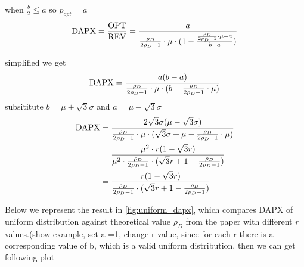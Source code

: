 when  $\frac{b}{2} \leqslant a$ so $p_{opt} = a$ 
\begin{equation}\notag
\text{DAPX} = \frac{\text{OPT}}{\text{REV}} =  \frac{a}{\frac{\rho_{D}}{2\rho_{D}-1}\cdot \mu \cdot (1-\frac{\frac{\rho_{D}}{2\rho_{D}-1}\cdot \mu -a}{b-a})}
\end{equation} 

simplified we get 
\begin{equation}\notag
\text{DAPX}=\frac{a(b-a)}{\frac{\rho_{D}}{2\rho_{D}-1}\cdot \mu \cdot(b-\frac{\rho_{D}}{2\rho_{D}-1}\cdot \mu)}
\end{equation} 
subsititute $b =  \mu +\sqrt{3}\sigma $ and $a  = \mu - \sqrt{3}\sigma$
\begin{equation}\notag
\begin{split}	
	\text{DAPX} &=\frac{2\sqrt{3}\sigma (\mu - \sqrt{3}\sigma)}{\frac{\rho_{D}}{2\rho_{D}-1}\cdot \mu \cdot( \sqrt{3}\sigma + \mu-\frac{\rho_{D}}{2\rho_{D}-1}\cdot \mu)} \\&= \frac{\mu^2 \cdot r( 1-\sqrt{3}r )}{\mu^2 \cdot \frac{\rho_{D}}{2\rho_{D}-1}\cdot( \sqrt{3}r+ 1-\frac{\rho_{D}}{2\rho_{D}-1})}\\ &= \frac{r( 1-\sqrt{3}r )}{\frac{\rho_{D}}{2\rho_{D}-1}\cdot( \sqrt{3}r+ 1-\frac{\rho_{D}}{2\rho_{D}-1})}
\end{split}
\end{equation} 

Below we represent the result in \cref{fig:uniform_dapx}, which compares DAPX of uniform distribution against theoretical value $\rho_D$ from the paper with different $r$ values.(show example, set a =1, change r value, since for each r there is a corresponding value of b, which is a valid uniform distribution, then we can get following plot



